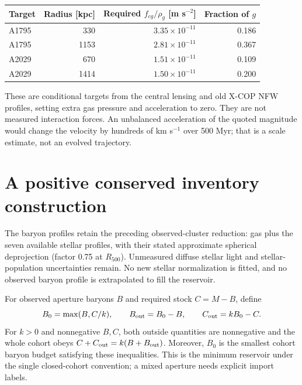 \documentclass[11pt]{article}
\begin{document}
\begin{center}
\begin{tabular}{lrrr}
\toprule
Target & Radius [kpc] & Required $f_{cg}/\rho_g$ [m s$^{-2}$] & Fraction of $g$\\
\midrule
A1795 & 330 & $3.35\times10^{-11}$ & 0.186\\
A1795 & 1153 & $2.81\times10^{-11}$ & 0.367\\
A2029 & 670 & $1.51\times10^{-11}$ & 0.109\\
A2029 & 1414 & $1.50\times10^{-11}$ & 0.200\\
\bottomrule
\end{tabular}
\end{center}
These are conditional targets from the central lensing and old X-COP NFW profiles, setting extra gas pressure and acceleration to zero. They are not measured interaction forces. An unbalanced acceleration of the quoted magnitude would change the velocity by hundreds of km s$^{-1}$ over 500 Myr; that is a scale estimate, not an evolved trajectory.

\clearpage
\section{A positive conserved inventory construction}
The baryon profiles retain the preceding observed-cluster reduction: gas plus
the seven available stellar profiles, with their stated approximate spherical
deprojection (factor 0.75 at $R_{500}$). Unmeasured diffuse stellar light and
stellar-population uncertainties remain. No new stellar normalization is
fitted, and no observed baryon profile is extrapolated to fill the reservoir.

For observed aperture baryons $B$ and required stock $C=M-B$, define
\begin{equation}
B_0=\max(B,C/k),\qquad
B_{\rm out}=B_0-B,\qquad C_{\rm out}=kB_0-C.
\label{eq:cohort}
\end{equation}
For $k>0$ and nonnegative $B,C$, both outside quantities are nonnegative and the whole cohort obeys $C+C_{\rm out}=k(B+B_{\rm out})$. Moreover, $B_0$ is the smallest cohort baryon budget satisfying these inequalities. This is the minimum reservoir under the single closed-cohort convention; a mixed aperture needs explicit import labels.
\end{document}
